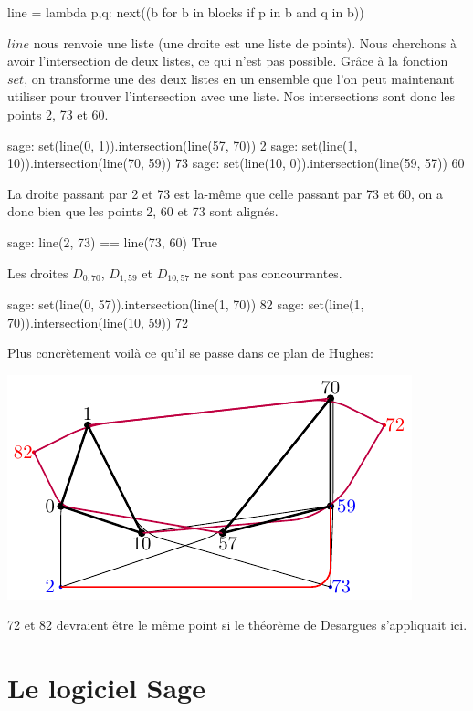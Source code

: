 \documentclass[a4paper]{article}
\begin{document}
\begin{sageverbatim}
 line = lambda p,q: next((b for b in blocks if p in b and q in b))
\end{sageverbatim}
$line$ nous renvoie une liste (une droite est une liste de points). Nous cherchons à avoir l'intersection de deux listes, ce qui n'est pas possible. Grâce à la fonction $set$, on transforme une des deux listes en un ensemble que l'on peut maintenant utiliser pour trouver l'intersection avec une liste. Nos intersections sont donc les points 2, 73 et 60.
\begin{sageverbatim}
 sage: set(line(0, 1)).intersection(line(57, 70))
 {2}
 sage: set(line(1, 10)).intersection(line(70, 59))
 {73}
 sage: set(line(10, 0)).intersection(line(59, 57))
 {60}
\end{sageverbatim}
La droite passant par 2 et 73 est la-même que celle passant par 73 et 60, on a donc bien que les points 2, 60 et 73 sont alignés.
\begin{sageverbatim}
 sage: line(2, 73) == line(73, 60)
 True
\end{sageverbatim}
Les droites $D_{0,70}$, $D_{1,59}$ et $D_{10,57}$ ne sont pas concourrantes.
\begin{sageverbatim}
 sage: set(line(0, 57)).intersection(line(1, 70))
 {82}
 sage: set(line(1, 70)).intersection(line(10, 59))
 {72}
\end{sageverbatim}
\newpage
Plus concrètement voilà ce qu'il se passe dans ce plan de Hughes:
\begin{center}
  \includegraphics[scale=1.5]{Hughestikz.pdf}
\end{center}
72 et 82 devraient être le même point si le théorème de Desargues s'appliquait ici.

\newpage
\section{Le logiciel Sage}
\end{document}
